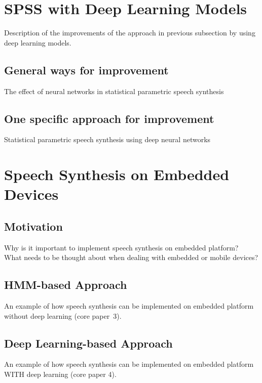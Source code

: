 \clearpage

\section{\ac{SPSS} with Deep Learning Models}
\label{sec:deepspeech}

Description of the improvements of the approach in previous subsection by using deep learning models.

\subsection{General ways for improvement}
\label{subsec:deepeffect}

The effect of neural networks in statistical parametric speech synthesis \cite{hashimoto:effect}

\subsection{One specific approach for improvement}
\label{subsec:deepspss}

Statistical parametric speech synthesis using deep neural networks \cite{zen:deepstatistical}

\section{Speech Synthesis on Embedded Devices}
\label{sec:embeddedspeech}

\subsection{Motivation}
\label{subsec:motembedded}

Why is it important to implement speech synthesis on embedded platform?\\
What needs to be thought about when dealing with embedded or mobile devices?

\subsection{\ac{HMM}-based Approach}
\label{subsec:hmmembedded}

An example of how speech synthesis can be implemented on embedded platform without deep learning (core paper~3).

\subsection{Deep Learning-based Approach}
\label{subsec:deepembedded}

An example of how speech synthesis can be implemented on embedded platform WITH deep learning (core paper 4).

\clearpage
